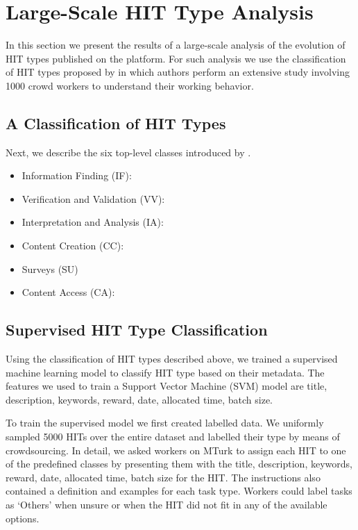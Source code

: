\section{Large-Scale HIT Type Analysis}\label{sec:type}
In this section we present the results of a large-scale analysis of the evolution of HIT types published on the \amt platform.
For such analysis we use the classification of HIT types proposed by \cite{Gadiraju:2014:TMW:2631775.2631819} in which authors perform an extensive study involving 1000 crowd workers to understand their working behavior. 

\subsection{A Classification of HIT Types}
Next, we describe the six top-level classes introduced by \cite{Gadiraju:2014:TMW:2631775.2631819}.

\begin{itemize}

	\item Information Finding (IF): 
	
	\item Verification and Validation (VV):

	\item Interpretation and Analysis (IA):
	
	\item Content Creation (CC):

	\item Surveys (SU)
	
	\item Content Access (CA):

\end{itemize}

\subsection{Supervised HIT Type Classification}
Using the classification of HIT types described above, we trained a supervised machine learning model to classify HIT type based on their metadata. The features we used to train a Support Vector Machine (SVM) model are title, description, keywords, reward, date, allocated time, batch size.

To train the supervised model we first created labelled data. We uniformly sampled 5000 HITs over the entire dataset and labelled their type by means of crowdsourcing. In detail, we asked workers on MTurk to assign each HIT to one of the predefined classes by presenting them with the title, description, keywords, reward, date, allocated time, batch size for the HIT. The instructions also contained a definition and examples for each task type. Workers could label tasks as `Others' when unsure or when the HIT did not fit in any of the available options.

